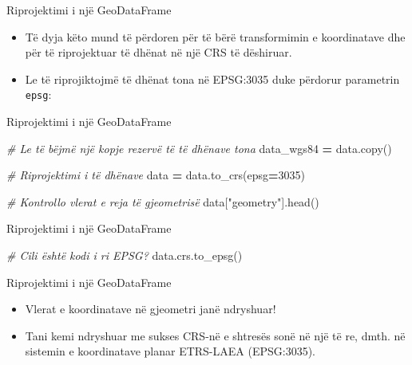 \documentclass[
  ignorenonframetext,
]{beamer}
\newenvironment{Shaded}{\begin{snugshade}}{\end{snugshade}}
\newcommand{\CommentTok}[1]{\textcolor[rgb]{0.56,0.35,0.01}{\textit{#1}}}
\newcommand{\DecValTok}[1]{\textcolor[rgb]{0.00,0.00,0.81}{#1}}
\newcommand{\NormalTok}[1]{#1}
\newcommand{\OperatorTok}[1]{\textcolor[rgb]{0.81,0.36,0.00}{\textbf{#1}}}
\newcommand{\StringTok}[1]{\textcolor[rgb]{0.31,0.60,0.02}{#1}}
\begin{document}
\begin{frame}[fragile]{Riprojektimi i një GeoDataFrame}
\protect\hypertarget{riprojektimi-i-njuxeb-geodataframe-2}{}
\begin{itemize}
\item
  Të dyja këto mund të përdoren për të bërë transformimin e koordinatave
  dhe për të riprojektuar të dhënat në një CRS të dëshiruar.
\item
  Le të riprojiktojmë të dhënat tona në EPSG:3035 duke përdorur
  parametrin \texttt{epsg}:
\end{itemize}
\end{frame}

\begin{frame}[fragile]{Riprojektimi i një GeoDataFrame}
\protect\hypertarget{riprojektimi-i-njuxeb-geodataframe-3}{}

\begin{Shaded}
\begin{Highlighting}[]
\CommentTok{\# Le të bëjmë një kopje rezervë të të dhënave tona}
\NormalTok{data\_wgs84 }\OperatorTok{=}\NormalTok{ data.copy()}

\CommentTok{\# Riprojektimi i të dhënave}
\NormalTok{data }\OperatorTok{=}\NormalTok{ data.to\_crs(epsg}\OperatorTok{=}\DecValTok{3035}\NormalTok{)}

\CommentTok{\# Kontrollo vlerat e reja të gjeometrisë}
\NormalTok{data[}\StringTok{"geometry"}\NormalTok{].head()}
\end{Highlighting}
\end{Shaded}
\end{frame}

\begin{frame}[fragile]{Riprojektimi i një GeoDataFrame}
\protect\hypertarget{riprojektimi-i-njuxeb-geodataframe-4}{}

\begin{Shaded}
\begin{Highlighting}[]
\CommentTok{\# Cili është kodi i ri EPSG?}
\NormalTok{data.crs.to\_epsg()}
\end{Highlighting}
\end{Shaded}
\end{frame}

\begin{frame}{Riprojektimi i një GeoDataFrame}
\protect\hypertarget{riprojektimi-i-njuxeb-geodataframe-5}{}
\begin{itemize}
\item
  Vlerat e koordinatave në gjeometri janë ndryshuar!
\item
  Tani kemi ndryshuar me sukses CRS-në e shtresës sonë në një të re,
  dmth. në sistemin e koordinatave planar ETRS-LAEA (EPSG:3035).
\end{itemize}
\end{frame}
\end{document}
